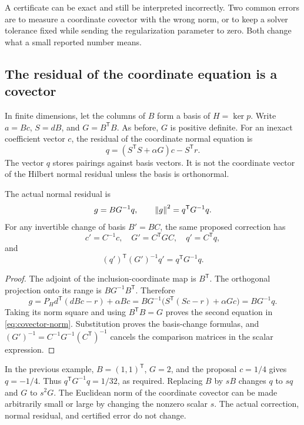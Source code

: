 \label{sec:stopping-rules}
A certificate can be exact and still be interpreted incorrectly. Two common errors are to measure a coordinate covector with the wrong norm, or to keep a solver tolerance fixed while sending the regularization parameter to zero. Both change what a small reported number means.

\subsection{The residual of the coordinate equation is a covector}
In finite dimensions, let the columns of $B$ form a basis of $H=\ker p$. Write $a=Bc$, $S=dB$, and $G=B^{\mathsf T}B$. As before, $G$ is positive definite. For an inexact coefficient vector $c$, the residual of the coordinate normal equation is
\[
 q=(S^{\mathsf T}S+\alpha G)c-S^{\mathsf T}r.
\]
The vector $q$ stores pairings against basis vectors. It is not the coordinate vector of the Hilbert normal residual unless the basis is orthonormal.

\begin{proposition}\label{WR15}
The actual normal residual is
\begin{equation}\label{eq:covector-norm}
 g=BG^{-1}q,\qquad \left\lVert g\right\rVert^2=q^{\mathsf T}G^{-1}q.
\end{equation}
For any invertible change of basis $B'=BC$, the same proposed correction has
\[
 c'=C^{-1}c,\quad G'=C^{\mathsf T}GC,\quad q'=C^{\mathsf T}q,
\]
and
\[
 (q')^{\mathsf T}(G')^{-1}q'=q^{\mathsf T}G^{-1}q.
\]
\end{proposition}
\begin{proof}
The adjoint of the inclusion-coordinate map is $B^{\mathsf T}$. The orthogonal projection onto its range is $BG^{-1}B^{\mathsf T}$. Therefore
\[
 g=P_Hd^{\mathsf T}(dBc-r)+\alpha Bc
   =BG^{-1}\bigl(S^{\mathsf T}(Sc-r)+\alpha Gc\bigr)=BG^{-1}q.
\]
Taking its norm square and using $B^{\mathsf T}B=G$ proves the second equation in \eqref{eq:covector-norm}. Substitution proves the basis-change formulas, and
$(G')^{-1}=C^{-1}G^{-1}(C^{\mathsf T})^{-1}$ cancels the comparison matrices in the scalar expression.
\end{proof}

In the previous example, $B=(1,1)^{\mathsf T}$, $G=2$, and the proposal $c=1/4$ gives $q=-1/4$. Thus $q^{\mathsf T}G^{-1}q=1/32$, as required. Replacing $B$ by $sB$ changes $q$ to $sq$ and $G$ to $s^2G$. The Euclidean norm of the coordinate covector can be made arbitrarily small or large by changing the nonzero scalar $s$. The actual correction, normal residual, and certified error do not change.

